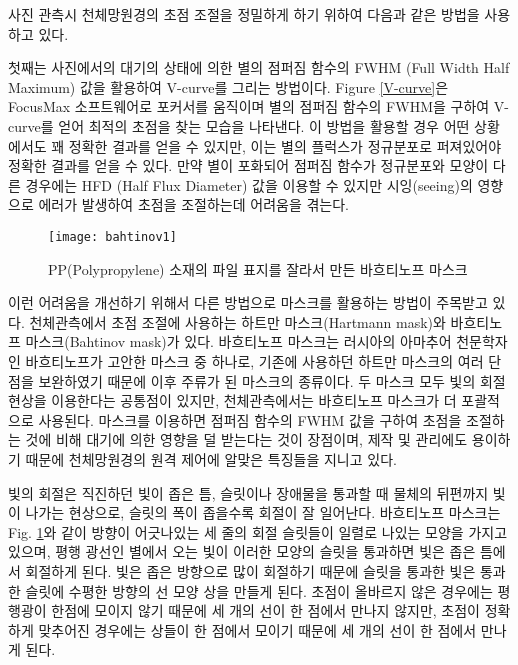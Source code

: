 사진 관측시 천체망원경의 초점 조절을 정밀하게 하기 위하여 다음과 같은 방법을 사용하고 있다. 

첫째는 사진에서의 대기의 상태에 의한 별의 점퍼짐 함수의 FWHM (Full Width Half Maximum) 값을 활용하여 V-curve를 그리는 방법이다. \textrm{Figure} \ref{V-curve}은 FocusMax 소프트웨어로 포커서를 움직이며 별의 점퍼짐 함수의 FWHM을 구하여 V-curve를 얻어 최적의 초점을 찾는 모습을 나타낸다. 이 방법을 활용할 경우 어떤 상황에서도 꽤 정확한 결과를 얻을 수 있지만, 이는 별의 플럭스가 정규분포로 퍼져있어야 정확한 결과를 얻을 수 있다. 만약 별이 포화되어 점퍼짐 함수가 정규분포와 모양이 다른 경우에는 HFD (Half Flux Diameter) 값을 이용할 수 있지만 시잉(seeing)의 영향으로 에러가 발생하여 초점을 조절하는데 어려움을 겪는다. 

\begin{figure}[ht]
	\begin{center}
		\texttt{[image: bahtinov1]}
	\end{center}
	\caption{PP(Polypropylene) 소재의 파일 표지를 잘라서 만든 바흐티노프 마스크}
	\label{bahtinov}
\end{figure}

이런 어려움을 개선하기 위해서 다른 방법으로 마스크를 활용하는 방법이 주목받고 있다. 천체관측에서 초점 조절에 사용하는 하트만 마스크(Hartmann mask)와 바흐티노프 마스크(Bahtinov mask)가 있다. 바흐티노프 마스크는 러시아의 아마추어 천문학자인 바흐티노프가 고안한 마스크 중 하나로, 기존에 사용하던 하트만 마스크의 여러 단점을 보완하였기 때문에 이후 주류가 된 마스크의 종류이다. 두 마스크 모두 빛의 회절 현상을 이용한다는 공통점이 있지만, 천체관측에서는 바흐티노프 마스크가 더 포괄적으로 사용된다. 마스크를 이용하면 점퍼짐 함수의 FWHM 값을 구하여 초점을 조절하는 것에 비해 대기에 의한 영향을 덜 받는다는 것이 장점이며, 제작 및 관리에도 용이하기 때문에 천체망원경의 원격 제어에 알맞은 특징들을 지니고 있다. 

빛의 회절은 직진하던 빛이 좁은 틈, 슬릿이나 장애물을 통과할 때 물체의 뒤편까지 빛이 나가는 현상으로, 슬릿의 폭이 좁을수록 회절이 잘 일어난다. 바흐티노프 마스크는 Fig. \ref{bahtinov}와 같이 방향이 어긋나있는 세 줄의 회절 슬릿들이 일렬로 나있는 모양을 가지고 있으며, 평행 광선인 별에서 오는 빛이 이러한 모양의 슬릿을 통과하면 빛은 좁은 틈에서 회절하게 된다. 빛은 좁은 방향으로 많이 회절하기 때문에 슬릿을 통과한 빛은 통과한 슬릿에 수평한 방향의 선 모양 상을 만들게 된다. 초점이 올바르지 않은 경우에는 평행광이 한점에 모이지 않기 때문에 세 개의 선이 한 점에서 만나지 않지만, 초점이 정확하게 맞추어진 경우에는 상들이 한 점에서 모이기 때문에 세 개의 선이 한 점에서 만나게 된다.


